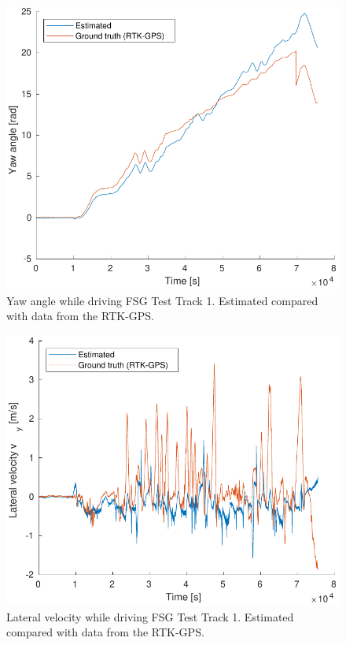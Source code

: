 \begin{figure}
    \centering
    \includegraphics[width=0.8\linewidth]{0_Images/6_Results/yawFSGTestTrack.pdf}
    \caption[Yaw angle while driving FSG Test Track 1.]
    {Yaw angle while driving FSG Test Track 1. Estimated compared with data from the RTK-GPS.}
    \label{Fig:YawFSGTestTrack}
\end{figure}

\begin{figure}
    \centering
    \includegraphics[width=0.8\linewidth]{0_Images/6_Results/vyFSGTestTrack.pdf}
    \caption[Lateral velocity while driving FSG Test Track 1.]
    {Lateral velocity  while driving FSG Test Track 1. Estimated compared with data from the RTK-GPS.}
    \label{Fig:VyFSGTestTrack}
\end{figure}


